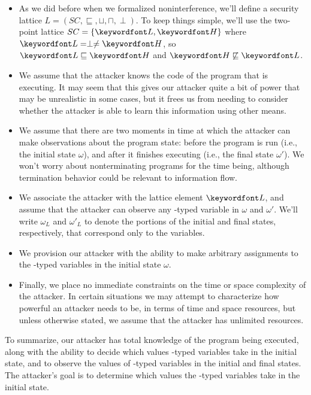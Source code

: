 \documentclass[11pt,twoside]{scrartcl}
\begin{document}
\begin{itemize}
\item As we did before when we formalized noninterference, we'll define a security lattice $L = (SC, \sqsubseteq, \sqcup, \sqcap, \perp)$. To keep things simple, we'll use the two-point lattice $SC = \{\lowsec, \hisec\}$ where $\lowsec = \perp \ne \hisec$, so $\lowsec \sqsubseteq \hisec$ and $\hisec \not\sqsubseteq \lowsec$.

\item We assume that the attacker knows the code of the program that is executing. It may seem that this gives our attacker quite a bit of power that may be unrealistic in some cases, but it frees us from needing to consider whether the attacker is able to learn this information using other means.

\item We assume that there are two moments in time at which the attacker can make observations about the program state: before the program is run (i.e., the initial state $\omega$), and after it finishes executing (i.e., the final state $\omega'$). We won't worry about nonterminating programs for the time being, although termination behavior could be relevant to information flow.

\item We associate the attacker with the lattice element $\lowsec$, and assume that the attacker can observe any \lowsec-typed variable in $\omega$ and $\omega'$. We'll write $\omega_L$ and $\omega'_L$ to denote the portions of the initial and final states, respectively, that correspond only to the \lowsec variables.

\item We provision our attacker with the ability to make arbitrary assignments to the \lowsec-typed variables in the initial state $\omega$.

\item Finally, we place no immediate constraints on the time or space complexity of the attacker. In certain situations we may attempt to characterize how powerful an attacker needs to be, in terms of time and space resources, but unless otherwise stated, we assume that the attacker has unlimited resources.
\end{itemize}

To summarize, our attacker has total knowledge of the program being executed, along with the ability to decide which values \lowsec-typed variables take in the initial state, and to observe the values of \lowsec-typed variables in the initial and final states. The attacker's goal is to determine which values the \hisec-typed variables take in the initial state.
\end{document}
